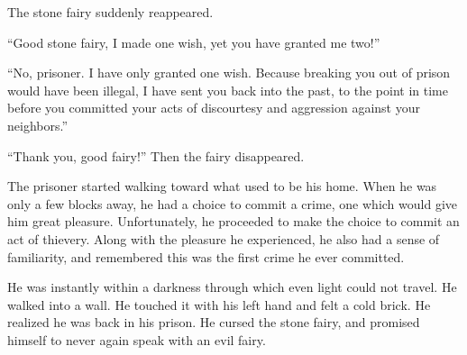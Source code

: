 The stone fairy suddenly reappeared.

“Good stone fairy, I made one wish, yet you have granted me two!”

“No, prisoner. I have only granted one wish. Because breaking you out of prison would have been illegal, I have sent you back into the past, to the point in time before you committed your acts of discourtesy and aggression against your neighbors.”

“Thank you, good fairy!” Then the fairy disappeared.

The prisoner started walking toward what used to be his home. When he was only a few blocks away, he had a choice to commit a crime, one which would give him great pleasure. Unfortunately, he proceeded to make the choice to commit an act of thievery. Along with the pleasure he experienced, he also had a sense of familiarity, and remembered this was the first crime he ever committed.

He was instantly within a darkness through which even light could not travel. He walked into a wall. He touched it with his left hand and felt a cold brick. He realized he was back in his prison. He cursed the stone fairy, and promised himself to never again speak with an evil fairy.